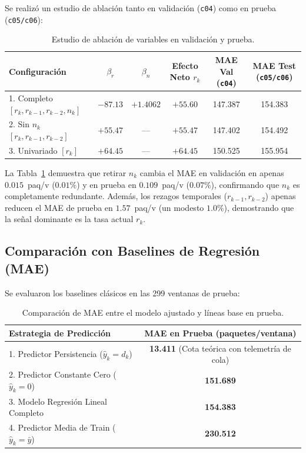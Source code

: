 \documentclass[11pt,a4paper]{article}
\begin{document}
Se realizó un estudio de ablación tanto en validación (\texttt{c04}) como en prueba (\texttt{c05/c06}):

\begin{table}[H]
\centering
\footnotesize
\caption{Estudio de ablación de variables en validación y prueba.}
\label{tab:ablacion}
\begin{tabularx}{\textwidth}{Xccccc}
\toprule
\textbf{Configuración} & \textbf{$\beta_r$} & \textbf{$\beta_n$} & \textbf{Efecto Neto $r_k$} & \textbf{MAE Val (\texttt{c04})} & \textbf{MAE Test (\texttt{c05/c06})} \\
\midrule
1. Completo $[r_k, r_{k-1}, r_{k-2}, n_k]$ & $-87.13$ & $+1.4062$ & $\mathbf{+55.60}$ & 147.387 & 154.383 \\
2. Sin $n_k$ $[r_k, r_{k-1}, r_{k-2}]$      & $+55.47$ & ---       & $\mathbf{+55.47}$ & 147.402 & 154.492 \\
3. Univariado $[r_k]$                      & $+64.45$ & ---       & $+64.45$          & 150.525 & 155.954 \\
\bottomrule
\end{tabularx}
\end{table}

La Tabla~\ref{tab:ablacion} demuestra que retirar $n_k$ cambia el MAE en validación en apenas $0.015$~paq/v ($0.01\%$) y en prueba en $0.109$~paq/v ($0.07\%$), confirmando que $n_k$ es completamente redundante. Además, los rezagos temporales ($r_{k-1}, r_{k-2}$) apenas reducen el MAE de prueba en $1.57$~paq/v (un modesto $1.0\%$), demostrando que la señal dominante es la tasa actual $r_k$.

\subsection{Comparación con Baselines de Regresión (MAE)}
Se evaluaron los baselines clásicos en las 299 ventanas de prueba:

\begin{table}[H]
\centering
\small
\caption{Comparación de MAE entre el modelo ajustado y líneas base en prueba.}
\label{tab:baselines_mae}
\begin{tabular}{lc}
\toprule
\textbf{Estrategia de Predicción} & \textbf{MAE en Prueba (paquetes/ventana)} \\
\midrule
1. Predictor Persistencia ($\hat{y}_k = d_k$)        & \textbf{13.411} (Cota teórica con telemetría de cola) \\
2. Predictor Constante Cero ($\hat{y}_k = 0$)        & \textbf{151.689} \\
3. Modelo Regresión Lineal Completo                  & \textbf{154.383} \\
4. Predictor Media de Train ($\hat{y}_k = \bar{y}$)  & \textbf{230.512} \\
\bottomrule
\end{tabular}
\end{table}
\end{document}
